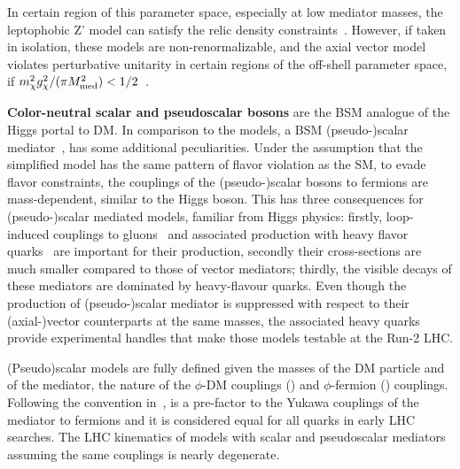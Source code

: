 In certain region of this parameter space, especially at low mediator masses,
the leptophobic Z' model can satisfy the relic density constraints~\cite{Chala:2015ama}.
However, if taken in isolation, these models are non-renormalizable, and the axial vector
model violates perturbative unitarity in certain regions of the off-shell parameter space,
if $m_{\chi}^2g_{\chi}^2/(\pi M_{\rm{med}}^2)<1/2$~\cite{Chala:2015ama,Kahlhoefer:2015bea,Boveia:2016mrp}. 



\textbf{Color-neutral scalar and pseudoscalar bosons} are the BSM analogue of the Higgs portal to DM. In comparison to the \Zprime models, a BSM (pseudo-)scalar mediator~\cite{Buckley:2014fba},  
has some additional peculiarities. 
Under the assumption that the simplified model has the same pattern of flavor violation as the SM, to evade flavor constraints, the couplings of the (pseudo-)scalar bosons to fermions are mass-dependent, similar to the Higgs boson. This has three consequences for
(pseudo-)scalar mediated models, familiar from Higgs physics: firstly,
loop-induced couplings to gluons~\cite{Haisch:2015ioa,Mattelaer:2015haa}
and associated production with heavy flavor quarks~\cite{Buckley:2014fba}
are important for their production,
secondly their cross-sections are much smaller
compared to those of vector mediators; thirdly, the visible decays
of these mediators are dominated by heavy-flavour quarks. 
Even though the production of (pseudo-)scalar mediator is
suppressed with respect to their (axial-)vector counterparts
at the same masses, the associated heavy quarks provide experimental handles that make those models testable at the Run-2 LHC.

(Pseudo)scalar models are fully defined given the masses of the DM particle and
of the mediator, the nature of the $\phi$-DM couplings (\gdm) and $\phi$-fermion (\gq) couplings.
Following the convention in~\cite{Abercrombie:2015wmb}, \gq is a pre-factor to the Yukawa couplings
of the mediator to fermions and it is considered equal for all quarks in early LHC searches. 
The LHC kinematics of models with scalar and pseudoscalar mediators assuming the same couplings is nearly
degenerate.

